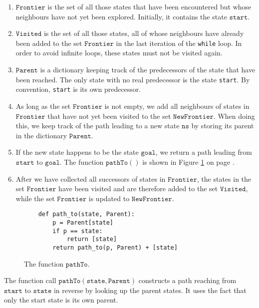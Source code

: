 \begin{enumerate}
\item $\texttt{Frontier}$ is the set of all those states that have been encountered but whose
      neighbours have not yet been explored.  Initially, it contains the state $\texttt{start}$.
\item $\texttt{Visited}$ is the set of all those states, all of whose neighbours have already been
      added to the set $\texttt{Frontier}$ in the last iteration of the \texttt{while} loop.  In order to avoid
      infinite loops, these states must not be visited again.
\item $\texttt{Parent}$ is a dictionary keeping track of the predecessors of the state that have been reached.
      The only state with no real predecessor is the state \texttt{start}.  By convention, \texttt{start} is its
      own predecessor.
\item As long as the set $\texttt{Frontier}$ is not empty, we add all neighbours of states in
      $\texttt{Frontier}$ that have not yet been visited to the set $\texttt{NewFrontier}$.
      When doing this, we keep track of the path leading to a new state $\texttt{ns}$ by storing its
      parent in the dictionary $\texttt{Parent}$.
\item If the new state happens to be the state $\texttt{goal}$, we return a path leading from
      $\texttt{start}$ to $\texttt{goal}$.  The function $\texttt{pathTo}()$ is shown in Figure
      \ref{fig:pathTo.stlx} on page \pageref{fig:pathTo.stlx}.
\item After we have collected all successors of states in $\texttt{Frontier}$, the states
      in the set $\texttt{Frontier}$ have been visited and are therefore added to the set
      $\texttt{Visited}$, while the set $\texttt{Frontier}$ is updated to $\texttt{NewFrontier}$.
\end{enumerate}

\begin{figure}[!ht]
\centering
\begin{verbatim}
    def path_to(state, Parent):
        p = Parent[state]
        if p == state:
            return [state]
        return path_to(p, Parent) + [state]
\end{verbatim}
\vspace*{-0.3cm}
\caption{The function $\texttt{pathTo}$.}
\label{fig:pathTo.stlx}
\end{figure}
The function call $\mathtt{pathTo}(\mathtt{state}, \mathtt{Parent})$ constructs a path reaching
from $\texttt{start}$ to $\texttt{state}$ in reverse by looking up the parent states.  It uses the fact that
only the start state is its own parent.

